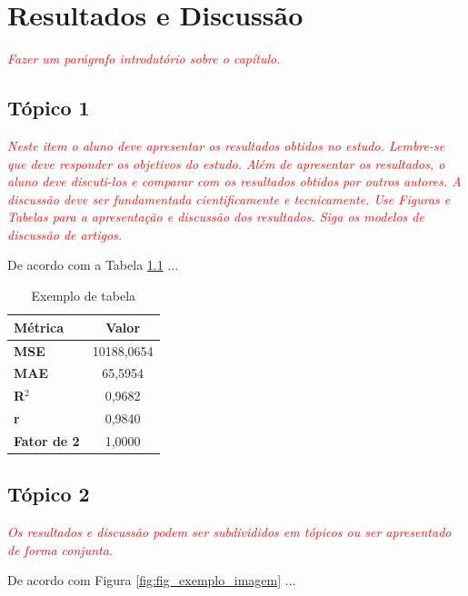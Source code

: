 \chapter{Resultados e Discussão}
\label{ch:resultados_discussao}

\textit{\textcolor{red}{Fazer um parágrafo introdutório sobre o capítulo.}}

\section{Tópico 1}
\label{sec:topico_1}

\textit{\textcolor{red}{Neste item o aluno deve apresentar os resultados obtidos no estudo. Lembre-se que deve responder os objetivos do estudo. Além de apresentar os resultados, o aluno deve discuti-los e comparar com os resultados obtidos por outros autores. A discussão deve ser fundamentada cientificamente e tecnicamente. Use Figuras e Tabelas para a apresentação e discussão dos resultados. Siga os modelos de discussão de artigos.}}

De acordo com a Tabela \ref{tab:exemplo_tabela} ...

\begin{table}[!ht]
	\caption{Exemplo de tabela}
	\centering
	\begin{tabular}{l|c}
		\hline
        \textbf{Métrica} & \textbf{Valor} \\ \hline 
        \textbf{MSE} & 10188,0654 \\ \hline 
        \textbf{MAE} & 65,5954 \\ \hline 
        \textbf{R$^2$} & 0,9682 \\ \hline 
        \textbf{r} & 0,9840 \\ \hline
        \textbf{Fator de 2} & 1,0000 \\ \hline
	\end{tabular}
	\label{tab:exemplo_tabela}
\end{table}

\section{Tópico 2}
\label{sec:topico_1}

\textit{\textcolor{red}{Os resultados e discussão podem ser subdivididos em tópicos ou ser apresentado de forma conjunta.}}

De acordo com Figura \ref{fig:fig_exemplo_imagem} ...

